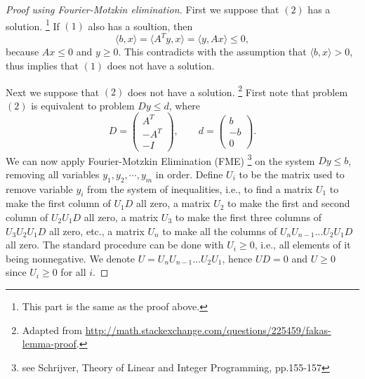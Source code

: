 \begin{proof}[Proof using Fourier-Motzkin elimination]
First we suppose that $(2)$ has a solution. 
\footnote{This part is the same as the proof above.}
If $(1)$ also has a soultion, then
\[
  \langle b,x \rangle = \langle A^T y, x \rangle = \langle y,Ax \rangle \le 0,
\]
because $Ax\le 0$ and $y\ge 0$. This contradicts with the assumption that
$\langle b,x \rangle >0$, thus implies that $(1)$ does not have a solution.

Next we suppose that $(2)$ does not have a solution. 
\footnote{Adapted from
\url{http://math.stackexchange.com/questions/225459/fakas-lemma-proof}.
}
First note that problem $(2)$ is equivalent to problem $D y\le d$, where
\[
  D=
  \begin{pmatrix}
    A^T \\
    -A^T \\
    -I
  \end{pmatrix},
  \qquad
  d=
  \begin{pmatrix}
    b \\
    -b \\
    0
  \end{pmatrix}.
\]
We can now apply Fourier-Motzkin Elimination (FME) 
\footnote{see Schrijver, Theory of Linear and Integer Programming, pp.155-157}
on the system $D y\le b$,
removing all variables $y_1,y_2,\cdots,y_m$ in order. Define $U_i$ to be the
matrix used to remove variable $y_i$ from the system of inequalities, i.e.,
to find a matrix $U_1$ to make the first column of $U_1 D$ all zero, 
a matrix $U_2$ to make the first and second column of $U_2 U_1 D$ all zero, 
a matrix $U_3$ to make the first three columns of $U_3 U_2 U_1 D$ all zero, etc.,
a matrix $U_n$ to make all the columns of $U_n U_{n-1}\dots U_2 U_1 D$ all zero.
The standard procedure can be done with $U_i\ge 0$, i.e., all elements of it 
being nonnegative. We denote $U=U_n U_{n-1}\dots U_2 U_1$, hence $U D=0$ and
$U\ge 0$ since $U_i\ge 0$ for all $i$.


\end{proof}
